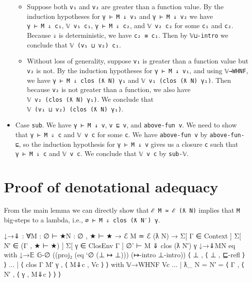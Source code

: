 \begin{itemize}
  \begin{itemize}
  \item
    Suppose both \texttt{v₁} and \texttt{v₂} are greater than a function
    value. By the induction hypotheses for \texttt{γ\ ⊢\ M\ ↓\ v₁} and
    \texttt{γ\ ⊢\ M\ ↓\ v₂} we have
    \texttt{γ\textquotesingle{}\ ⊢\ M\ ⇓\ c₁}, \texttt{𝕍\ v₁\ c₁},
    \texttt{γ\textquotesingle{}\ ⊢\ M\ ⇓\ c₂}, and \texttt{𝕍\ v₂\ c₂}
    for some \texttt{c₁} and \texttt{c₂}. Because \texttt{⇓} is
    deterministic, we have \texttt{c₂\ ≡\ c₁}. Then by \texttt{𝕍⊔-intro}
    we conclude that \texttt{𝕍\ (v₁\ ⊔\ v₂)\ c₁}.
  \item
    Without loss of generality, suppose \texttt{v₁} is greater than a
    function value but \texttt{v₂} is not. By the induction hypotheses
    for \texttt{γ\ ⊢\ M\ ↓\ v₁}, and using \texttt{𝕍→WHNF}, we have
    \texttt{γ\textquotesingle{}\ ⊢\ M\ ⇓\ clos\ (ƛ\ N)\ γ₁} and
    \texttt{𝕍\ v₁\ (clos\ (ƛ\ N)\ γ₁)}. Then because \texttt{v₂} is not
    greater than a function, we also have
    \texttt{𝕍\ v₂\ (clos\ (ƛ\ N)\ γ₁)}. We conclude that
    \texttt{𝕍\ (v₁\ ⊔\ v₂)\ (clos\ (ƛ\ N)\ γ₁)}.
  \end{itemize}
\item
  Case \texttt{sub}. We have \texttt{γ\ ⊢\ M\ ↓\ v},
  \texttt{v\textquotesingle{}\ ⊑\ v}, and
  \texttt{above-fun\ v\textquotesingle{}}. We need to show that
  \texttt{γ\textquotesingle{}\ ⊢\ M\ ⇓\ c} and
  \texttt{𝕍\ v\textquotesingle{}\ c} for some \texttt{c}. We have
  \texttt{above-fun\ v} by \texttt{above-fun-⊑}, so the induction
  hypothesis for \texttt{γ\ ⊢\ M\ ↓\ v} gives us a closure \texttt{c}
  such that \texttt{γ\textquotesingle{}\ ⊢\ M\ ⇓\ c} and
  \texttt{𝕍\ v\ c}. We conclude that \texttt{𝕍\ v\textquotesingle{}\ c}
  by \texttt{sub-𝕍}.
\end{itemize}

\hypertarget{proof-of-denotational-adequacy}{%
\section{Proof of denotational
adequacy}\label{proof-of-denotational-adequacy}}

From the main lemma we can directly show that
\texttt{ℰ\ M\ ≃\ ℰ\ (ƛ\ N)} implies that \texttt{M} big-steps to a
lambda, i.e., \texttt{∅\ ⊢\ M\ ⇓\ clos\ (ƛ\ N′)\ γ}.

\begin{fence}
\begin{code}
↓→⇓ : ∀{M : ∅ ⊢ ★}{N : ∅ , ★ ⊢ ★}  →  ℰ M ≃ ℰ (ƛ N)
         →  Σ[ Γ ∈ Context ] Σ[ N′ ∈ (Γ , ★ ⊢ ★) ] Σ[ γ ∈ ClosEnv Γ ]
            ∅' ⊢ M ⇓ clos (ƛ N′) γ
↓→⇓{M}{N} eq
    with ↓→𝔼 𝔾-∅ ((proj₂ (eq `∅ (⊥ ↦ ⊥))) (↦-intro ⊥-intro))
                 ⟨ ⊥ , ⟨ ⊥ , ⊑-refl ⟩ ⟩
... | ⟨ clos {Γ} M′ γ , ⟨ M⇓c , Vc ⟩ ⟩
    with 𝕍→WHNF Vc
... | ƛ_ {N = N′} =
    ⟨ Γ , ⟨ N′ , ⟨ γ , M⇓c ⟩  ⟩ ⟩
\end{code}
\end{fence}

